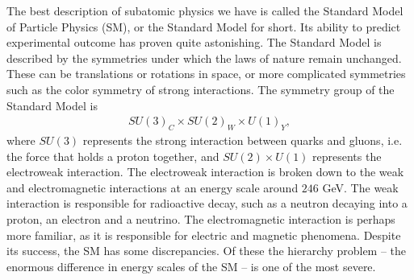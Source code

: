 \documentclass[11pt]{article}
\begin{document}
\begin{flushleft}
The best description of subatomic physics we have is called the Standard Model of Particle Physics (SM), or the Standard Model for short. Its ability to predict experimental outcome has proven quite astonishing. The Standard Model is described by the symmetries under which the laws of nature remain unchanged. These can be translations or rotations in space, or more complicated symmetries such as the color symmetry of strong interactions. The symmetry group of the Standard Model is
\begin{align}
SU(3)_C \times SU(2)_W \times U(1)_Y,
\end{align}
where $SU(3)$ represents the strong interaction between quarks and gluons, i.e. the force that holds a proton together, and $SU(2) \times U(1)$ represents the electroweak interaction. The electroweak interaction is broken down to the weak and electromagnetic interactions at an energy scale around $246$ GeV. The weak interaction is responsible for radioactive decay, such as a neutron decaying into a proton, an electron and a neutrino. The electromagnetic interaction is perhaps more familiar, as it is responsible for electric and magnetic phenomena. Despite its success, the SM has some discrepancies. Of these the hierarchy problem -- the enormous difference in energy scales of the SM -- is one of the most severe.
\end{flushleft}
\end{document}

